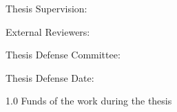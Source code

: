 
Thesis Supervision: 
\begin{mydescription}
    \item \supervisor
\end{mydescription}

\vspace{10 mm}
External Reviewers: 

\vspace{30 mm}

Thesis Defense Committee: 


\vspace{50mm}



Thesis Defense Date: 



\vspace{\fill}
\begin{spacing}{1.0}
Funds of the work during the thesis
\end{spacing}
